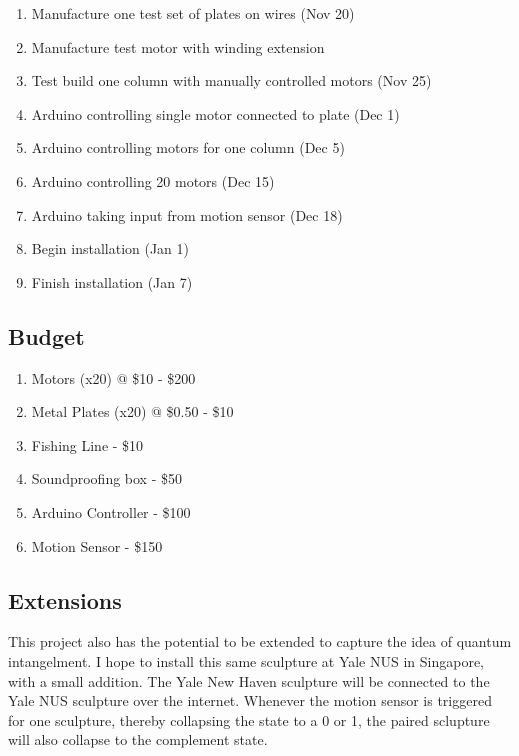 \begin{enumerate}
\item Manufacture one test set of plates on wires (Nov 20)
\item Manufacture test motor with winding extension
\item Test build one column with manually controlled motors (Nov 25)
\item Arduino controlling single motor connected to plate (Dec 1)
\item Arduino controlling motors for one column (Dec 5)
\item Arduino controlling 20 motors (Dec 15)
\item Arduino taking input from motion sensor (Dec 18)
\item Begin installation (Jan 1)
\item Finish installation (Jan 7)
\end{enumerate}

\subsection{Budget}

\begin{enumerate}
\item Motors (x20) @ \$10 - \$200
\item Metal Plates (x20) @ \$0.50 - \$10
\item Fishing Line - \$10
\item Soundproofing box - \$50
\item Arduino Controller - \$100
\item Motion Sensor - \$150
\end{enumerate}

\subsection{Extensions}

This project also has the potential to be extended to capture the idea of quantum intangelment.
I hope to install this same sculpture at Yale NUS in Singapore, with a small addition.
The Yale New Haven sculpture will be connected to the Yale NUS sculpture over the internet.
Whenever the motion sensor is triggered for one sculpture, thereby collapsing the state to a 0 or 1, the paired sclupture will also collapse to the complement state.


